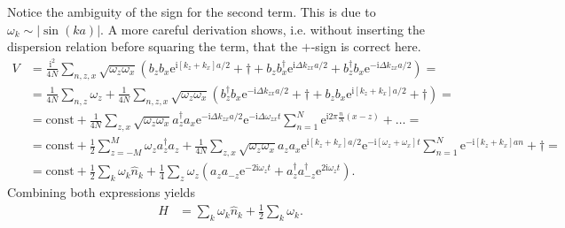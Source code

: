 \documentclass[english, parskip=full]{scrartcl}
\newcommand{\kla}{}
\newcommand{\tecxt}{}
\def\I{\text{i}}
\def\e{\text{e}}
\begin{document}
Notice the ambiguity of the sign for the second term. 
This is due to $\omega_k\sim |\sin(ka)|$.
A more careful derivation shows, i.e. without inserting the dispersion relation before squaring the term, that the $+$-sign is correct here.
\begin{align}
V&=\frac{\I^2}{4N}\sum_{n,z,x}\sqrt{\omega_z\omega_x}\kla\left( {b_zb_x\e^{\I [k_z+k_x]a/2}+\dagger +b_zb_x^\dagger\e^{\I \Delta k_{zx} a/2} +b_z^\dagger b_x\e^{-\I \Delta k_{zx} a/2}} \right)=\\
&=\frac{1}{4N}\sum_{n,z}\omega_z+\frac{1}{4N}\sum_{n,z,x}\sqrt{\omega_z\omega_x}\kla\left( {b_z^\dagger b_x\e^{-\I \Delta k_{zx} a/2}+\dagger+b_z b_x\e^{\I [k_z+k_x]a/2}+\dagger} \right)=\\
&=\tecxt\text{const}+\frac{1}{4N}\sum_{z,x}\sqrt{\omega_z\omega_x}a_z^\dagger a_x\e^{-\I \Delta k_{zx} a/2}\e^{-\I\Delta\omega_{zx}t}\sum_{n=1}^N\e^{\I 2\pi\frac{n}{N}(x-z)}+\dots=\\
&=\tecxt\text{const}+\frac{1}{2}\sum_{z=-M}^M\omega_za_z^\dagger a_z+\frac{1}{4N}\sum_{z,x}\sqrt{\omega_z\omega_x}a_za_x\e^{\I [k_z+k_x]a/2}\e^{-\I[\omega_z+\omega_x]t}\sum_{n=1}^N\e^{-\I[k_z+k_x]an}+\dagger=\\
&=\tecxt\text{const}+\frac{1}{2}\sum_k\omega_k\hat{n}_k+\frac{1}{4}\sum_z\omega_z\kla\left( {a_za_{-z}\e^{-2\I\omega_zt}+a_z^{\dagger}a_{-z}^\dagger\e^{2\I\omega_zt}} \right).
\end{align}
Combining both expressions yields
\begin{align*}
H&=\sum_k\omega_k\hat{n}_k+\frac{1}{2}\sum_k\omega_k.
\end{align*}
\end{document}
